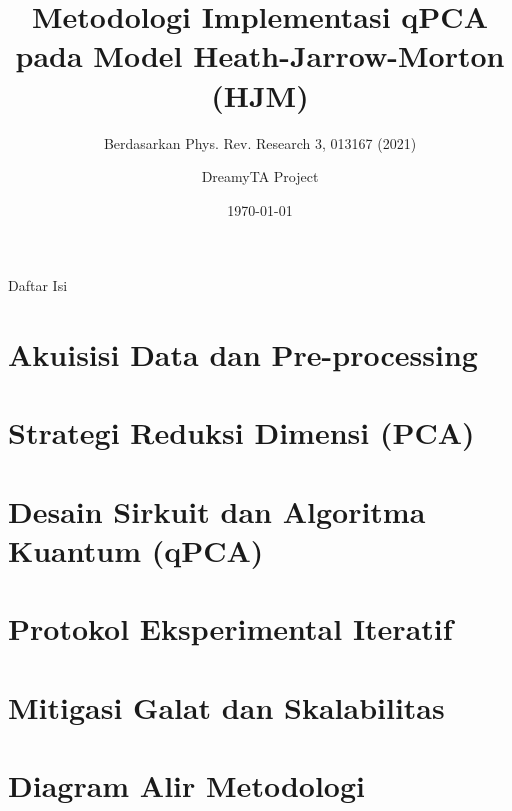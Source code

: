 \documentclass[10pt, aspectratio=169]{beamer}
\title{Metodologi Implementasi qPCA pada Model Heath-Jarrow-Morton (HJM)}
\subtitle{Berdasarkan Phys. Rev. Research 3, 013167 (2021)}
\author{DreamyTA Project}
\date{\today}
\begin{document}
\maketitle

\begin{frame}{Daftar Isi}
    \tableofcontents
\end{frame}

\section{Akuisisi Data dan Pre-processing}


\section{Strategi Reduksi Dimensi (PCA)}


\section{Desain Sirkuit dan Algoritma Kuantum (qPCA)}


\section{Protokol Eksperimental Iteratif}


\section{Mitigasi Galat dan Skalabilitas}


\section{Diagram Alir Metodologi}

\end{document}
